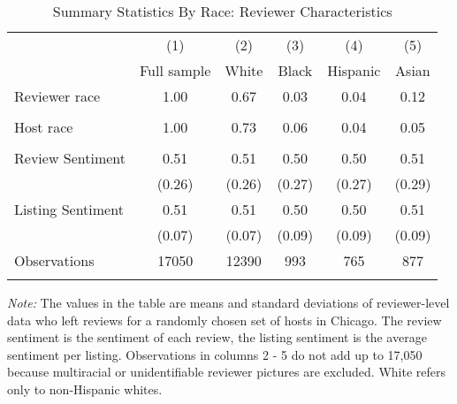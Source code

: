 \begin{table}[htbp]
\caption{Summary Statistics By Race: Reviewer Characteristics}
\begin{center}%
\small\begin{tabular}{l c c c c c}
 \cmidrule(r){1-6}
 & (1) & (2) & (3) & (4) & (5)
\\
 & \multicolumn{1}{c}{Full sample} & White & Black & Hispanic & Asian
\\
\hline\hline\noalign{\smallskip} 
 Reviewer race & 1.00 & 0.67 & 0.03 & 0.04 & 0.12 \\\\
 Host race & 1.00 & 0.73 & 0.06 & 0.04 & 0.05 \\\\
 Review Sentiment & 0.51 & 0.51 & 0.50 & 0.50 & 0.51 \\
 & (0.26) & (0.26) & (0.27) & (0.27) & (0.29) \\
 Listing Sentiment & 0.51 & 0.51 & 0.50 & 0.50 & 0.51 \\
 & (0.07) & (0.07) & (0.09) & (0.09) & (0.09) \\
\hline
Observations & 17050 & 12390 & 993 & 765 & 877
\\
\hline\hline\noalign{\smallskip} \end{tabular} 
\begin{minipage}{6in}
{\it Note:} The values in the table are means and standard deviations of reviewer-level data who left reviews for a randomly chosen set of hosts in Chicago. The review sentiment is the sentiment of each review, the listing sentiment is the average sentiment per listing. Observations in columns 2 - 5 do not add up to 17,050 because multiracial or unidentifiable reviewer pictures are excluded. White refers only to non-Hispanic whites.
\end{minipage}
\end{center}
\end{table}
